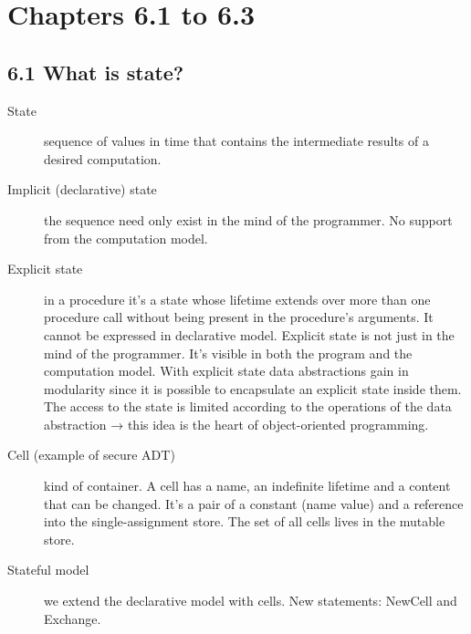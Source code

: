 \section{Chapters 6.1 to 6.3}
\subsection{6.1 What is state?}

\begin{description}
  \item[State] sequence of values in time that contains the intermediate results of a desired computation.
  \item[Implicit (declarative) state] the sequence need only exist in the mind of the programmer.
    No support from the computation model.
  \item[Explicit state] in a procedure it's a state whose lifetime extends over more than one procedure call without being present in the procedure's arguments.
    It cannot be expressed in declarative model.
    Explicit state is not just in the mind of the programmer.
    It's visible in both the program and the computation model.
    With explicit state data abstractions gain in modularity since it is possible to encapsulate an explicit state inside them.
    The access to the state is limited according to the operations of the data abstraction → this idea is the heart of object-oriented programming.
  \item[Cell (example of secure ADT)] kind of container.
    A cell has a name, an indefinite lifetime and a content that can be changed.
    It's a pair of a constant (name value) and a reference into the single-assignment store.
    The set of all cells lives in the mutable store.
  \item[Stateful model] we extend the declarative model with cells.
    New statements: NewCell and Exchange.
\end{description}

